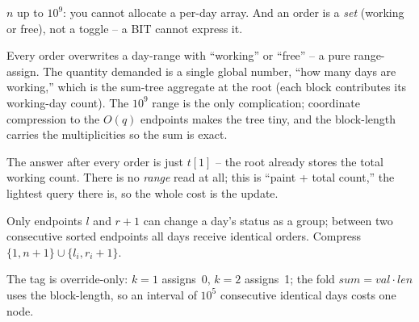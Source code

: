 \begin{attemptgate}
\(n\) up to \(10^9\): you cannot allocate a per-day array.  And an order is a \emph{set} (working or free), not a toggle -- a BIT cannot express it.
\end{attemptgate}

Every order overwrites a day-range with ``working'' or ``free'' -- a pure range-assign.  The quantity demanded is a single global number, ``how many days are working,'' which is the sum-tree aggregate at the root (each block contributes its working-day count).  The \(10^9\) range is the only complication; coordinate compression to the \(O(q)\) endpoints makes the tree tiny, and the block-length carries the multiplicities so the sum is exact.

\begin{observation}
The answer after every order is just \(t[1]\) -- the root already stores the total working count.  There is no \emph{range} read at all; this is ``paint + total count,'' the lightest query there is, so the whole cost is the update.
\end{observation}
\begin{observation}
Only endpoints \(l\) and \(r+1\) can change a day's status as a group; between two consecutive sorted endpoints all days receive identical orders.  Compress \(\{1,n{+}1\}\cup\{l_i,r_i{+}1\}\).
\end{observation}
\begin{observation}
The tag is override-only: \(k{=}1\) assigns~0, \(k{=}2\) assigns~1; the fold \(\mathit{sum}=\mathit{val}\cdot\mathit{len}\) uses the block-length, so an interval of \(10^5\) consecutive identical days costs one node.
\end{observation}

